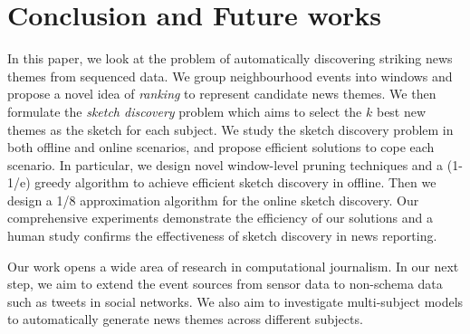 \section{Conclusion and Future works} \label{sec:conclusion}
In this paper, we look at the problem of automatically discovering striking news themes from sequenced data. 
We group neighbourhood events into windows and propose a novel idea of \emph{ranking} to represent candidate news themes. We then formulate the \emph{sketch discovery} problem which aims to select the $k$ best new themes as the sketch for each subject. 
We study the sketch discovery problem in both offline and online scenarios,
and propose efficient solutions to cope each scenario. In particular, we design novel window-level pruning techniques and a (1-1/e) greedy algorithm to achieve efficient sketch discovery in offline. Then we design a 1/8 approximation algorithm for the online sketch discovery.
Our comprehensive experiments demonstrate the efficiency of our solutions and a human study confirms the effectiveness of sketch discovery in news reporting.

Our work opens a wide area of research in computational journalism. In our next step, we aim to extend the event sources from sensor data to non-schema data such as tweets in social networks. We also aim to investigate multi-subject models to automatically generate news themes across different subjects.


